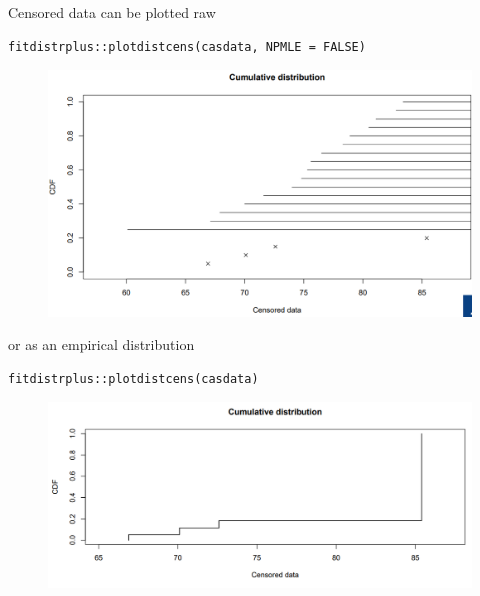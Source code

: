 \documentclass[11pt]{article}
\newcommand{\noi}{\noindent}
\begin{document}
\noi Censored data can be plotted raw
\begin{lstlisting}
fitdistrplus::plotdistcens(casdata, NPMLE = FALSE)
\end{lstlisting}
\begin{figure}[H]
    \centering
    \includegraphics[width=0.7\linewidth]{right censor - raw cdf plot.png}
\end{figure}

\noi or as an empirical distribution
\begin{lstlisting}
fitdistrplus::plotdistcens(casdata)
\end{lstlisting}
\begin{figure}[H]
    \centering
    \includegraphics[width=0.7\linewidth]{right censor - raw data empirical plot.png}
\end{figure}
\end{document}
